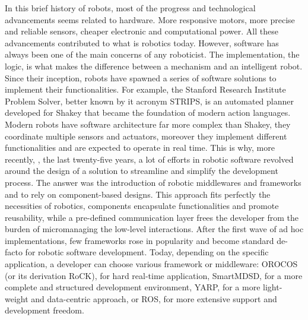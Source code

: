 In this brief history of robots, most of the progress and technological advancements seems related to hardware. More responsive motors, more precise and reliable sensors, cheaper electronic and computational power. All these advancements contributed to what is robotics today. However, software has always been one of the main concerns of any roboticist. The implementation, the logic, is what makes the difference between a mechanism and an intelligent robot. Since their inception, robots have spawned a series of software solutions to implement their functionalities. For example, the Stanford Research Institute Problem Solver, better known by it acronym STRIPS, is an automated planner developed for Shakey that became the foundation of modern action languages. Modern robots have software architecture far more complex than Shakey, they coordinate multiple sensors and actuators, moreover they implement different functionalities and are expected to operate in real time. This is why, more recently, \ie, the last twenty-five years, a lot of efforts in robotic software revolved around the design of a solution to streamline and simplify the development process. The answer was the introduction of robotic middlewares and frameworks and to rely on component-based designs. This approach fits perfectly the necessities of robotics, components encapsulate functionalities and promote reusability, while a pre-defined communication layer frees the developer from the burden of micromanaging the low-level interactions. After the first wave of ad hoc implementations, few frameworks rose in popularity and become standard de-facto for robotic software development. Today, depending on the specific application, a developer can choose various framework or middleware: OROCOS (or its derivation RoCK), for hard real-time application, SmartMDSD, for a more complete and structured development environment, YARP, for a more light-weight and data-centric approach, or ROS, for more extensive support and development freedom.

